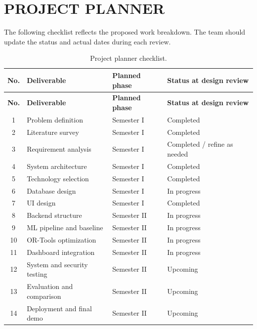 \documentclass[12pt,a4paper,oneside]{report}
\begin{document}
\appendix
\chapter{PROJECT PLANNER}
The following checklist reflects the proposed work breakdown. The team should update the status and actual dates during each review.
\begin{longtable}{c p{65mm} p{30mm} p{25mm}}
\caption{Project planner checklist.}\\
\toprule
\textbf{No.} & \textbf{Deliverable} & \textbf{Planned phase} & \textbf{Status at design review}\\
\midrule
\endfirsthead
\toprule
\textbf{No.} & \textbf{Deliverable} & \textbf{Planned phase} & \textbf{Status at design review}\\
\midrule
\endhead
1 & Problem definition & Semester I & Completed\\
2 & Literature survey & Semester I & Completed\\
3 & Requirement analysis & Semester I & Completed / refine as needed\\
4 & System architecture & Semester I & Completed\\
5 & Technology selection & Semester I & Completed\\
6 & Database design & Semester I & In progress\\
7 & UI design & Semester I & Completed\\
8 & Backend structure & Semester II & In progress\\
9 & ML pipeline and baseline & Semester II & In progress\\
10 & OR-Tools optimization & Semester II & In progress\\
11 & Dashboard integration & Semester II & In progress\\
12 & System and security testing & Semester II & Upcoming\\
13 & Evaluation and comparison & Semester II & Upcoming\\
14 & Deployment and final demo & Semester II & Upcoming\\
\bottomrule
\end{longtable}
\end{document}
